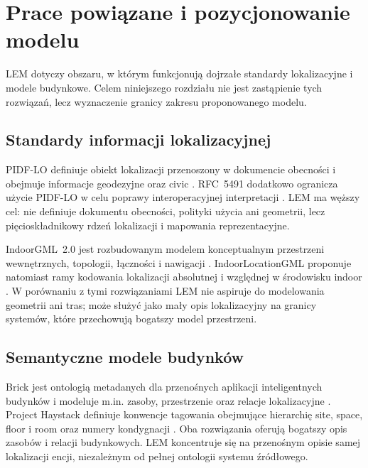 
\chapter{Prace powiązane i pozycjonowanie modelu}
\label{chap:related-work}

LEM dotyczy obszaru, w którym funkcjonują dojrzałe standardy lokalizacyjne i modele budynkowe. Celem niniejszego rozdziału nie jest zastąpienie tych rozwiązań, lecz wyznaczenie granicy zakresu proponowanego modelu.

\section{Standardy informacji lokalizacyjnej}
PIDF-LO definiuje obiekt lokalizacji przenoszony w dokumencie obecności i obejmuje informacje geodezyjne oraz civic \cite{RFC4119,RFC5139}. RFC~5491 dodatkowo ogranicza użycie PIDF-LO w celu poprawy interoperacyjnej interpretacji \cite{RFC5491}. LEM ma węższy cel: nie definiuje dokumentu obecności, polityki użycia ani geometrii, lecz pięcioskładnikowy rdzeń lokalizacji i mapowania reprezentacyjne.

IndoorGML~2.0 jest rozbudowanym modelem konceptualnym przestrzeni wewnętrznych, topologii, łączności i nawigacji \cite{IndoorGML2025}. IndoorLocationGML proponuje natomiast ramy kodowania lokalizacji absolutnej i względnej w środowisku indoor \cite{IndoorLocationGML2016}. W porównaniu z tymi rozwiązaniami LEM nie aspiruje do modelowania geometrii ani tras; może służyć jako mały opis lokalizacyjny na granicy systemów, które przechowują bogatszy model przestrzeni.

\section{Semantyczne modele budynków}
Brick jest ontologią metadanych dla przenośnych aplikacji inteligentnych budynków i modeluje m.in. zasoby, przestrzenie oraz relacje lokalizacyjne \cite{Brick2018}. Project Haystack definiuje konwencje tagowania obejmujące hierarchię site, space, floor i room oraz numery kondygnacji \cite{HaystackSpaces2026}. Oba rozwiązania oferują bogatszy opis zasobów i relacji budynkowych. LEM koncentruje się na przenośnym opisie samej lokalizacji encji, niezależnym od pełnej ontologii systemu źródłowego.

